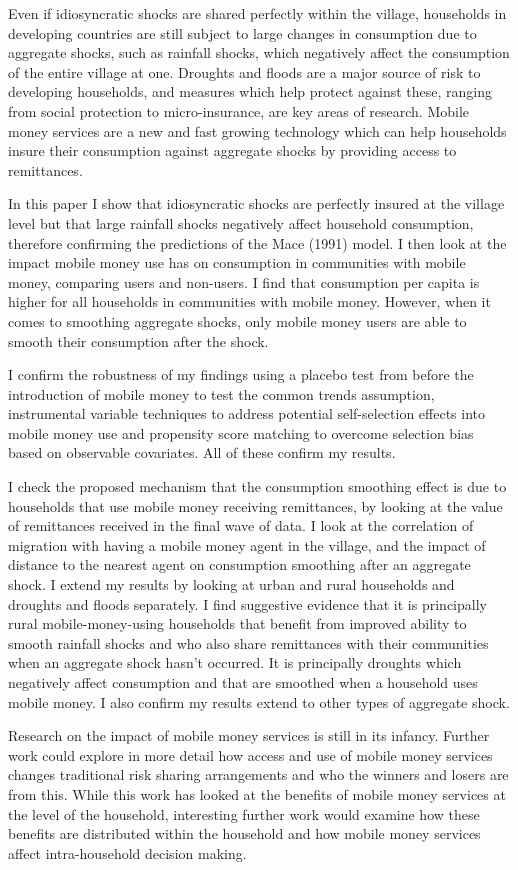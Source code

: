 Even if idiosyncratic shocks are shared perfectly within the village, households in developing countries are still subject to large changes in consumption due to aggregate shocks, such as rainfall shocks, which negatively affect the consumption of the entire village at one. Droughts and floods are a major source of risk to developing households, and measures which help protect against these, ranging from social protection to micro-insurance, are key areas of research. Mobile money services are a new and fast growing technology which can help households insure their consumption against aggregate shocks by providing access to remittances.

In this paper I show that idiosyncratic shocks are perfectly insured at the village level but that large rainfall shocks negatively affect household consumption, therefore confirming the predictions of the Mace (1991) model. I then look at the impact mobile money use has on consumption in communities with mobile money, comparing users and non-users. I find that consumption per capita is higher for all households in communities with mobile money. However, when it comes to smoothing aggregate shocks, only mobile money users are  able to smooth their consumption after the shock. 

I confirm the robustness of my findings using a placebo test from before the introduction of mobile money to test the common trends assumption, instrumental variable techniques to address potential self-selection effects into mobile money use and propensity score matching to overcome selection bias based on observable covariates. All of these confirm my results. 

I check the proposed mechanism that the consumption smoothing effect is due to households that use mobile money receiving remittances, by looking at the value of remittances received in the final wave of data. I look at the correlation of migration with having a mobile money agent in the village, and the impact of distance to the nearest agent on consumption smoothing after an aggregate shock. I extend my results by looking at urban and rural households and droughts and floods separately. I find suggestive evidence that it is principally rural mobile-money-using households that benefit from improved ability to smooth rainfall shocks and who also share remittances with their communities when an aggregate shock hasn't occurred. It is principally droughts which negatively affect consumption and that are smoothed when a household uses mobile money. I also confirm my results extend to other types of aggregate shock.  

Research on the impact of mobile money services is still in its infancy. Further work could explore in more detail how access and use of mobile money services changes traditional risk sharing arrangements and who the winners and losers are from this. While this work has looked at the benefits of mobile money services at the level of the household, interesting further work would examine how these benefits are distributed within the household and how mobile money services affect intra-household decision making. 


